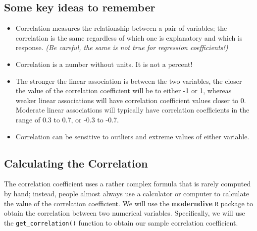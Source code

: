 \documentclass[
  letterpaper,
  DIV=11,
  numbers=noendperiod]{scrartcl}
\providecommand{\tightlist}{%
  \setlength{\itemsep}{0pt}\setlength{\parskip}{0pt}}\usepackage{longtable,booktabs,array}
\begin{document}
\vspace{0.5cm}


\hypertarget{some-key-ideas-to-remember}{%
\subsection{Some key ideas to
remember}\label{some-key-ideas-to-remember}}

\begin{itemize}
\tightlist
\item
  Correlation measures the relationship between a pair of variables; the
  correlation is the same regardless of which one is explanatory and
  which is response. \emph{(Be careful, the same is not true for
  regression coefficients!)}
\item
  Correlation is a number without units. It is not a percent!
\item
  The stronger the linear association is between the two variables, the
  closer the value of the correlation coefficient will be to either -1
  or 1, whereas weaker linear associations will have correlation
  coefficient values closer to 0. Moderate linear associations will
  typically have correlation coefficients in the range of 0.3 to 0.7, or
  -0.3 to -0.7.
\item
  Correlation can be sensitive to outliers and extreme values of either
  variable.
\end{itemize}

\hypertarget{calculating-the-correlation}{%
\subsection{Calculating the
Correlation}\label{calculating-the-correlation}}

The correlation coefficient uses a rather complex formula that is rarely
computed by hand; instead, people almost always use a calculator or
computer to calculate the value of the correlation coefficient. We will
use the \textbf{moderndive} \texttt{R} package to obtain the correlation
between two numerical variables. Specifically, we will use the
\texttt{get\_correlation()} function to obtain our sample correlation
coefficient.
\end{document}
